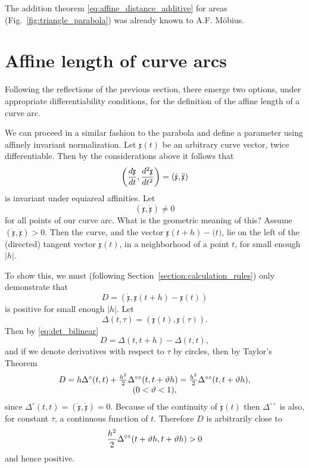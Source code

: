\documentclass[11pt]{book} \usepackage{amssymb}
\newcommand{\myvec}[1]{\mathfrak{#1}}
\newcommand{\vecx}{\myvec{x}}
\newcommand{\vecderiv}[1]{\dot{\myvec{#1}}}
\newcommand{\vecderivv}[1]{\ddot{\myvec{#1}}}
\begin{document}
The addition theorem \eqref{eq:affine_distance_additive} for areas 
(Fig.~\ref{fig:triangle_parabola}) was already known to A.F. M\"obius.

\section{Affine length of curve arcs}

Following the reflections of the previous section, there emerge two options,
under appropriate differentiability conditions, for the definition of the 
affine length of a curve arc.

We can proceed in a similar fashion to the parabola and define a parameter
using affinely invariant normalization. Let $\vecx(t)$ be an arbitrary
curve vector, twice differentiable. Then by the considerations above it 
follows that
$$\left({d\vecx\over dt},{d^2\vecx\over dt^2}\right)
=(\vecderiv{x},\vecderivv{x})$$
is invariant under equiareal affinities. Let 
\begin{equation}
  \label{eq:no_inflection}
  (\vecderiv{x},\vecderivv{x})\neq 0
\end{equation}
for all points of our curve arc. What is the geometric meaning of this? Assume
$(\vecderiv{x},\vecderivv{x}) > 0$. Then the curve, and the vector
$\vecx(t+h)-\myvec(t)$, lie on the left of the (directed) tangent vector
$\vecderiv{x}(t)$, in a neighborhood of a point $t$, for small enough $|h|$.

To show this, we must (following Section~\ref{section:calculation_rules}) 
only demonstrate that
$$ D=(\vecderiv{x}, \vecx(t+h)-\vecx(t))$$
is positive for small enough $|h|$. Let
$$\Delta(t,\tau)=(\vecderiv{x}(t),\vecx(\tau)).$$
Then by \eqref{eq:det_bilinear}
$$D=\Delta(t,t+h)-\Delta(t,t),$$
and if we denote derivatives with respect to $\tau$ by circles, then by 
Taylor's Theorem
\begin{equation}
  \label{eq:distance_taylor}
  \begin{array}{c}    
    D=h\Delta^{\circ}(t,t)+{h^2\over 2}\Delta^{\circ\circ}(t,t+\vartheta h)
    = {h^2\over 2}\Delta^{\circ\circ}(t,t+\vartheta h),\\
    (0<\vartheta<1),
  \end{array}      
\end{equation}
since $\Delta^\circ(t,t)=(\vecderiv{x},\vecderiv{x})=0$. Because of the 
continuity of $\vecderiv{x}(t)$ then $\Delta^{\circ\circ}$ is also, for constant
$\tau$, a continuous function of $t$. Therefore $D$ is arbitrarily close to
\begin{equation}
  \label{eq:d_approx}
  {h^2\over 2}\Delta^{\circ\circ}(t+\vartheta h, t+ \vartheta h)>0
\end{equation}
and hence positive.
\end{document}
